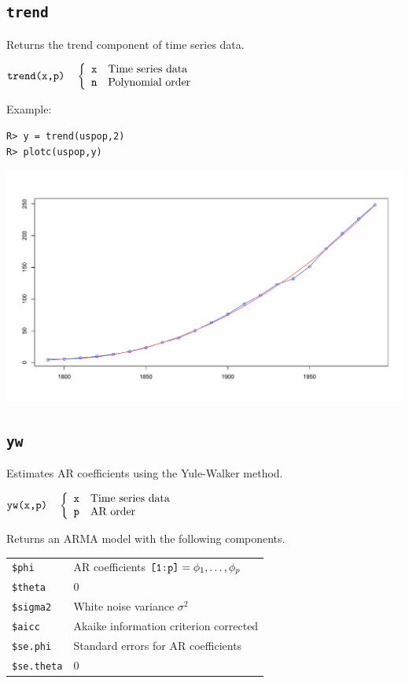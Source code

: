 \documentclass[12pt]{article}
\begin{document}
\newpage

\subsection{\tt trend}
Returns the trend component of time series data.

\bigskip
$
\hbox{\tt trend(x,p)}\quad\left\{\begin{array}{ll}
{\tt x} & \hbox{Time series data}\\
{\tt n} & \hbox{Polynomial order}\\
\end{array}\right.
$

\bigskip
\noindent
Example:
\begin{verbatim}
R> y = trend(uspop,2)
R> plotc(uspop,y)
\end{verbatim}

\begin{center}
\includegraphics[scale=0.3]{Rplot-3.pdf}
\end{center}

\newpage

\subsection{\tt yw}
Estimates AR coefficients using the Yule-Walker method.

\bigskip
$
\hbox{\tt yw(x,p)}\quad\left\{\begin{array}{ll}
{\tt x} & \hbox{Time series data}\\
{\tt p} & \hbox{AR order}
\end{array}\right.
$

\bigskip
\noindent
Returns an ARMA model with the following components.

\begin{center}
\begin{tabular}{ll}
{\tt \$phi} & AR coefficients $\hbox{\tt[1:p]}=\phi_1,\ldots,\phi_p$\\
{\tt \$theta} & 0\\
{\tt \$sigma2} & White noise variance $\sigma^2$\\
{\tt \$aicc} & Akaike information criterion corrected\\
{\tt \$se.phi} & Standard errors for AR coefficients\\
{\tt \$se.theta} & 0
\end{tabular}
\end{center}
\end{document}
